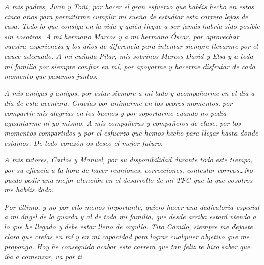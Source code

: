 \begin{flushleft}
    \textit{A mis padres, Juan y Toñi, por hacer el gran esfuerzo que habéis hecho en estos cinco años para permitirme cumplir mi sueño de estudiar esta carrera lejos de casa. Todo lo que consiga en la vida y quién llegue a ser jamás habría sido posible sin vosotros. A mi hermano Marcos y a mi hermano Óscar, por aprovechar vuestra experiencia y los años de diferencia para intentar siempre llevarme por el cauce adecuado. A mi cuñada Pilar, mis sobrinos Marcos David y Elsa y a toda mi familia por siempre confiar en mí, por apoyarme y hacerme disfrutar de cada momento que pasamos juntos.}

    \textit{A mis amigas y amigos, por estar siempre a mi lado y acompañarme en el día a día de esta aventura. Gracias por animarme en los peores momentos, por compartir mis alegrías en los buenos y por soportarme cuando no podía aguantarme ni yo mismo. A mis compañeras y compañeros de clase, por los momentos compartidos y por el esfuerzo que hemos hecho para llegar hasta donde estamos. De todo corazón os deseo el mejor futuro.}

    \textit{A mis tutores, Carlos y Manuel, por su disponibilidad durante todo este tiempo, por su eficacia a la hora de hacer reuniones, correcciones, contestar correos\dots No puedo pedir una mejor atención en el desarrollo de mi TFG que la que vosotros me habéis dado.}

    \textit{Por último, y no por ello menos importante, quiero hacer una dedicatoria especial a mi ángel de la guarda y al de toda mi familia, que desde arriba estará viendo a lo que he llegado y debe estar lleno de orgullo. Tito Camilo, siempre me dejaste claro que creías en mí y en mi capacidad para lograr cualquier objetivo que me proponga. Hoy he conseguido acabar esta carrera que tan feliz te hizo saber que iba a comenzar, va por ti.}
\end{flushleft}
